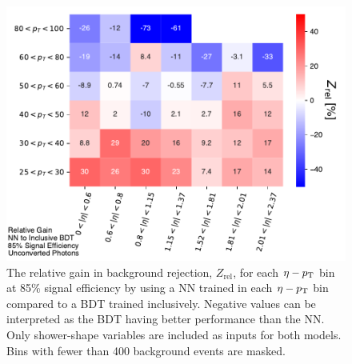 \begin{figure}[!htb]
    \centering
    \includegraphics[width=.85\textwidth]{chapters/chapter4_photonID/images/NN_v_BDTinclusive_normed.pdf}
    \caption[The relative gain in background rejection by using a \gls{NN} trained bin-wise compared to a \gls{BDT} trained inclusively]
    {The relative gain in background rejection, $Z_{\text{rel}}$, for each $\eta-p_{\text{T}}$ bin at 85\% signal efficiency by using a \gls{NN} trained in each $\eta-p_{\text{T}}$ bin compared to a \gls{BDT} trained inclusively. Negative values can be interpreted as the \gls{BDT} having better performance than the \gls{NN}. Only shower-shape variables are included as inputs for both models. Bins with fewer than 400 background events are masked.}
    \label{fig:nn-v-bdt-unconverted}
\end{figure}


